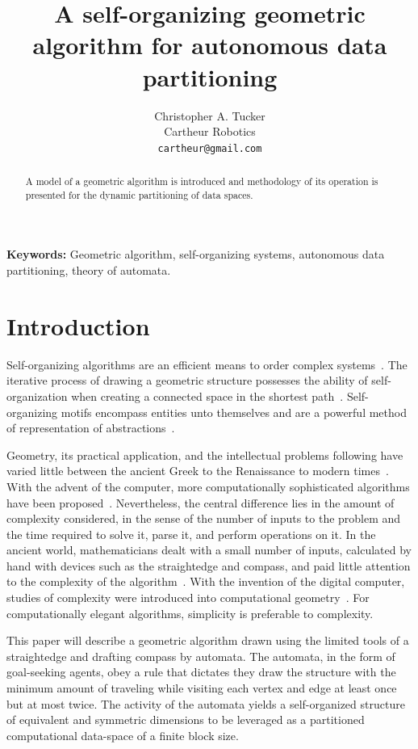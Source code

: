\documentclass[11pt]{article}
\title{A self-organizing geometric algorithm for autonomous data partitioning}
\author{Christopher A. Tucker\\Cartheur Robotics\\\texttt{cartheur@gmail.com}}
\date{}
\begin{document}
\maketitle

\begin{abstract}
A model of a geometric algorithm is introduced and methodology of its operation is presented for the dynamic partitioning of data spaces.
\end{abstract}

\noindent\textbf{Keywords:} Geometric algorithm, self-organizing systems, autonomous data partitioning, theory of automata.

\section{Introduction}

Self-organizing algorithms are an efficient means to order complex systems~\cite{ashby1957,simula1999,guerin2004}. The iterative process of drawing a geometric structure possesses the ability of self-organization when creating a connected space in the shortest path~\cite{orlin2010}. Self-organizing motifs encompass entities unto themselves and are a powerful method of representation of abstractions~\cite{pattee1995}.

Geometry, its practical application, and the intellectual problems following have varied little between the ancient Greek to the Renaissance to modern times~\cite{netz1999}. With the advent of the computer, more computationally sophisticated algorithms have been proposed~\cite{graham1972}. Nevertheless, the central difference lies in the amount of complexity considered, in the sense of the number of inputs to the problem and the time required to solve it, parse it, and perform operations on it. In the ancient world, mathematicians dealt with a small number of inputs, calculated by hand with devices such as the straightedge and compass, and paid little attention to the complexity of the algorithm~\cite{toussaint1992}. With the invention of the digital computer, studies of complexity were introduced into computational geometry~\cite{shamos1975}. For computationally elegant algorithms, simplicity is preferable to complexity.

This paper will describe a geometric algorithm drawn using the limited tools of a straightedge and drafting compass by automata. The automata, in the form of goal-seeking agents, obey a rule that dictates they draw the structure with the minimum amount of traveling while visiting each vertex and edge at least once but at most twice. The activity of the automata yields a self-organized structure of equivalent and symmetric dimensions to be leveraged as a partitioned computational data-space of a finite block size.
\end{document}
